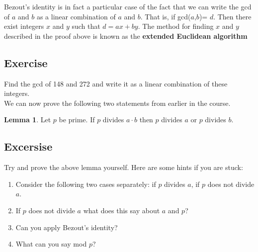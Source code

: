 \documentclass[12pt]{amsart}
\theoremstyle{definition}
\newtheorem{lemma}[theorem]{Lemma}
\theoremstyle{definition}
\theoremstyle{remark}
\begin{document}
Bezout's identity is in fact a particular case of the fact that we can write the gcd of $a$ and $b$ as a linear combination of $a$ and $b$. That is, if gcd($a$,$b$)= $d$. Then there exist integers $x$ and $y$ such that $d=ax+by$. The method for finding $x$ and $y$ described in the proof above is known as the \textbf{extended Euclidean algorithm}

\subsection*{Exercise}
Find the gcd of 148 and 272 and write it as a linear combination of these integers.\\




We can now prove the following two statements from earlier in the course.

\begin{lemma}
Let $p$ be prime. If $p$ divides $a\cdot b$ then $p$ divides $a$ or $p$ divides $b$.
\end{lemma}

\subsection*{Excersise}
Try and prove the above lemma yourself. Here are some hints if you are stuck:
\begin{enumerate}
\item Consider the following two cases separately: if $p$ divides $a$, if $p$ does not divide $a$.
\item If $p$ does not divide $a$ what does this say about $a$ and $p$?
\item Can you apply Bezout's identity?
\item What can you say mod $p$?
\end{enumerate}



\end{document}
